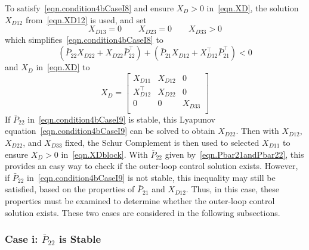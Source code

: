 To satisfy\ \eqref{eqn.condition4bCaseI8} and ensure $X_{D}>0$ in\ \eqref{eqn.XD}, the solution $X_{D12}$ from\ \eqref{eqn.XD12} is used, and set
\begin{equation*}
  X_{D13} = 0
  \qquad
  X_{D23} = 0
  \qquad
  X_{D33} > 0
\end{equation*}
which simplifies\ \eqref{eqn.condition4bCaseI8} to
\begin{equation}
  \label{eqn.condition4bCaseI9}
  (\bar{P}_{22}X_{D22} + X_{D22}\bar{P}_{22}^{\top})
  +(\bar{P}_{21}X_{D12} + X_{D12}^{\top}\bar{P}_{21}^{\top})
  <0
\end{equation}
and $X_{D}$ in\ \eqref{eqn.XD} to
\begin{equation}
  \label{eqn.XDblock}
  X_{D} =
  \begin{bmatrix}
    X_{D11} & X_{D12} & 0 \\
    X_{D12}^{\top} & X_{D22} & 0 \\
    0 & 0 & X_{D33} \\
  \end{bmatrix}
\end{equation}
If $\bar{P}_{22}$ in\ \eqref{eqn.condition4bCaseI9} is stable, this Lyapunov equation\ \eqref{eqn.condition4bCaseI9} can be solved to obtain $X_{D22}$.
Then with $X_{D12}$, $X_{D22}$, and $X_{D33}$ fixed, the Schur Complement is then used to selected $X_{D11}$ to ensure $X_{D}>0$ in\ \eqref{eqn.XDblock}.
With $\bar{P}_{22}$ given by\ \eqref{eqn.Pbar21andPbar22}, this provides an easy way to check if the outer-loop control solution exists.
However, if $\bar{P}_{22}$ in\ \eqref{eqn.condition4bCaseI9} is not stable, this inequality may still be satisfied, based on the properties of $\bar{P}_{21}$ and $X_{D12}$.
Thus, in this case, these properties must be examined to determine whether the outer-loop control solution exists.
These two cases are considered in the following subsections.

\subsubsection{Case i: $\bar{P}_{22}$ is Stable}

